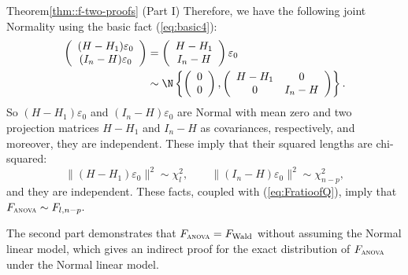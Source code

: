 \begin{myproof}{Theorem}{\ref{thm::f-two-proofs} (Part I)}
Therefore, we have the following joint Normality using the basic fact
(\ref{eq:basic4}): 
\begin{align*}
\left(\begin{array}{c}
(H-H_{1})\varepsilon_{0}\\
(I_{n}-H)\varepsilon_{0}
\end{array}\right) & =\left(\begin{array}{c}
H-H_{1}\\
I_{n}-H
\end{array}\right)\varepsilon_{0}\\
 & \sim\N\left\{ \left(\begin{array}{c}
0\\
0
\end{array}\right),\left(\begin{array}{cc}
H-H_{1} & 0\\
0 & I_{n}-H
\end{array}\right)\right\} .
\end{align*}
So $(H-H_{1})\varepsilon_{0}$ and $(I_{n}-H)\varepsilon_{0}$ are
Normal with mean zero and two projection matrices $H-H_{1}$ and $I_{n}-H$
as covariances, respectively, and moreover, they are independent.
These imply that their squared lengths are chi-squared:
\[
\|(H-H_{1})\varepsilon_{0}\|^{2}\sim\chi_{l}^{2},\qquad\|(I_{n}-H)\varepsilon_{0}\|^{2}\sim\chi_{n-p}^{2},
\]
and they are independent. These facts, coupled with (\ref{eq:FratioofQ}),
imply that $F_\textsc{anova}  \sim F_{l,n-p}.$ 
\end{myproof}


The second part demonstrates that $F_\textsc{anova}  = F_\text{Wald}$ without assuming the Normal linear model, which gives an indirect proof for the exact distribution of $F_\textsc{anova}$ under the Normal linear model. 

